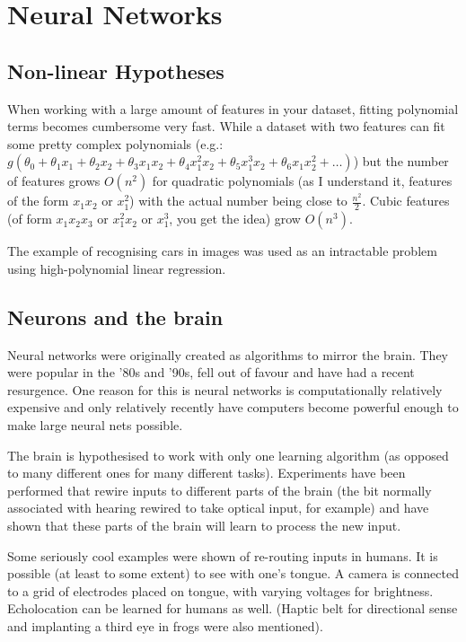 
\chapter{Neural Networks}
\section{Non-linear Hypotheses}
When working with a large amount of features in your dataset, fitting polynomial terms becomes cumbersome very fast. While a dataset with two features can fit some pretty complex polynomials (e.g.: $g(\theta_0 + \theta_1x_1 + \theta_2x_2 + \theta_3x_1x_2 + \theta_4x_1^2x_2 + \theta_5x_1^3x_2 + \theta_6x_1x_2^2 + \dots)$) but the number of features grows $O(n^2)$ for quadratic polynomials (as I understand it, features of the form $x_1x_2$ or $x_1^2$) with the actual number being close to $\frac{n^2}{2}$. Cubic features (of form $x_1x_2x_3$ or $x_1^2x_2$ or $x_1^3$, you get the idea) grow $O(n^3)$.

The example of recognising cars in images was used as an intractable problem using high-polynomial linear regression.

\section{Neurons and the brain}
Neural networks were originally created as algorithms to mirror the brain. They were popular in the '80s and '90s, fell out of favour and have had a recent resurgence. One reason for this is neural networks is computationally relatively expensive and only relatively recently have computers become powerful enough to make large neural nets possible.

The brain is hypothesised to work with only one learning algorithm (as opposed to many different ones for many different tasks). Experiments have been performed that rewire inputs to different parts of the brain (the bit normally associated with hearing rewired to take optical input, for example) and have shown that these parts of the brain will learn to process the new input.

Some seriously cool examples were shown of re-routing inputs in humans. It is possible (at least to some extent) to see with one's tongue. A camera is connected to a grid of electrodes placed on tongue, with varying voltages for brightness. Echolocation can be learned for humans as well. (Haptic belt for directional sense and implanting a third eye in frogs were also mentioned).

